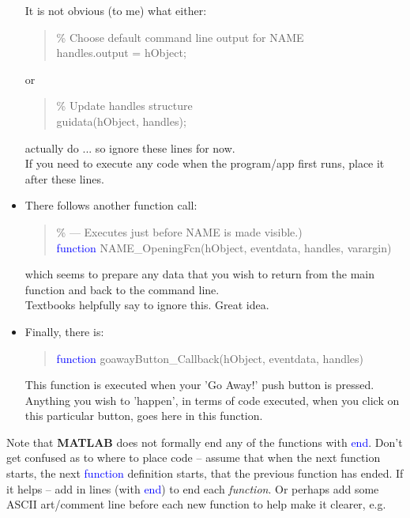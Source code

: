\documentclass{tufte-book} %
\newenvironment{docspec}{\begin{quotation}\ttfamily\parskip0pt\parindent0pt\ignorespaces}{\end{quotation}}
\begin{document}
\begin{itemize}
It is not obvious (to me) what either:
\vspace{-2mm}
\begin{docspec}
\textcolor[rgb]{0,0.501961,0}{\% Choose default command line output for NAME}\\
handles.output = hObject;
\end{docspec}
\vspace{-1mm}
or
\vspace{-2mm}
\begin{docspec}
\textcolor[rgb]{0,0.501961,0}{\% Update handles structure}\\
guidata(hObject, handles);
\end{docspec}
\vspace{-1mm}
actually do ... so ignore these lines for now.
\\If you need to execute any code when the program/app first runs, place it after these lines.

\item There follows another function call:
\begin{docspec}
\textcolor[rgb]{0,0.501961,0}{\% --- Executes just before NAME is made visible.)}\\
\textcolor{blue}{function} NAME\_OpeningFcn(hObject, eventdata, handles, varargin)
\end{docspec}
which seems to prepare any data that you wish to return from the main function and back to the command line.
\\Textbooks helpfully say to ignore this. Great idea.

\item Finally, there is:
\begin{docspec}
\textcolor{blue}{function} goawayButton\_Callback(hObject, eventdata, handles)
\end{docspec}
This function is executed when your 'Go Away!' push button is pressed.
Anything you wish to 'happen', in terms of code executed, when you click on this particular button, goes here in this function. 
\end{itemize}

Note that \textbf{MATLAB} does not formally end any of the functions with \textcolor{blue}{end}. Don't get confused as to where to place code -- assume that when the next function starts, the next \textcolor{blue}{function} definition starts, that the previous function has ended. If it helps -- add in lines (with \textcolor{blue}{end}) to end each \textit{function}. Or perhaps add some ASCII art/comment line before each new function to help make it clearer, e.g.
\end{document}
